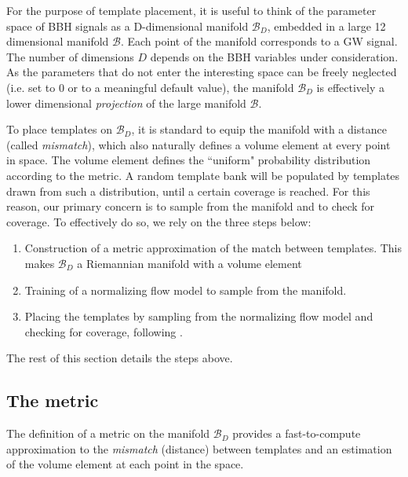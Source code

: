 \documentclass[twocolumn,showpacs,preprintnumbers,nofootinbib,prd,
superscriptaddress,10pt]{revtex4-2}
\begin{document}
For the purpose of template placement, it is useful to think of the parameter space of BBH signals as a D-dimensional manifold $\mathcal{B}_D$, embedded in a large 12 dimensional manifold $\mathcal{B}$. Each point of the manifold corresponds to a GW signal. The number of dimensions $D$ depends on the BBH variables under consideration.
As the parameters that do not enter the interesting space can be freely neglected (i.e. set to $0$ or to a meaningful default value), the manifold $\mathcal{B}_D$ is effectively a lower dimensional {\it projection} of the large manifold $\mathcal{B}$.

To place templates on $\mathcal{B}_D$, it is standard to equip the manifold with a distance (called {\it mismatch}), which also naturally defines a volume element at every point in space. The volume element defines the ``uniform" probability distribution according to the metric.
A random template bank will be populated by templates drawn from such a distribution, until a certain coverage is reached. For this reason, our primary concern is to sample from the manifold and to check for coverage. To effectively do so, we rely on the three steps below:
\begin{enumerate}
	\item Construction of a metric approximation of the match between templates. This makes $\mathcal{B}_D$ a Riemannian manifold with a volume element
	\item Training of a normalizing flow model to sample from the manifold. 
	\item Placing the templates by sampling from the normalizing flow model and checking for coverage, following \cite{Coogan:2022qxs}.
\end{enumerate}
The rest of this section details the steps above.

\subsection{The metric} \label{sec:metric}

The definition of a metric on the manifold $\mathcal{B}_D$ provides a fast-to-compute approximation to the {\it mismatch} (distance) between templates and an estimation of the volume element at each point in the space.
\end{document}

